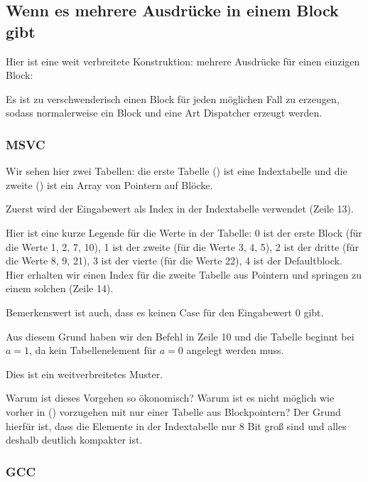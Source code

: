 \subsection{Wenn es mehrere  Ausdrücke in einem Block gibt}
Hier ist eine weit verbreitete Konstruktion: mehrere  Ausdrücke für einen einzigen Block:


Es ist zu verschwenderisch einen Block für jeden möglichen Fall zu erzeugen, sodass normalerweise ein Block und eine Art
Dispatcher erzeugt werden.

\subsubsection{MSVC}


Wir sehen hier zwei Tabellen: die erste Tabelle () ist eine Indextabelle und die zweite () ist
ein Array von Pointern auf Blöcke.

Zuerst wird der Eingabewert als Index in der Indextabelle verwendet (Zeile 13).

Hier ist eine kurze Legende für die Werte in der Tabelle:
0 ist der erste  Block (für die Werte 1, 2, 7, 10),
1 ist der zweite (für die Werte 3, 4, 5),
2 ist der dritte (für die Werte 8, 9, 21),
3 ist der vierte (für die Werte 22),
4 ist der Defaultblock.
Hier erhalten wir einen Index für die zweite Tabelle aus Pointern und springen zu einem solchen (Zeile 14).

Bemerkenswert ist auch, dass es keinen Case für den Eingabewert 0 gibt. 

Aus diesem Grund haben wir den \DEC Befehl in Zeile 10 und die Tabelle beginnt bei $a=1$, da kein Tabellenelement für
$a=0$ angelegt werden muss.

Dies ist ein weitverbreitetes Muster.

Warum ist dieses Vorgehen so ökonomisch?
Warum ist es nicht möglich wie vorher in () vorzugehen mit nur einer Tabelle aus Blockpointern?
Der Grund hierfür ist, dass die Elemente in der Indextabelle nur 8 Bit groß sind und alles deshalb deutlich kompakter
ist.

\subsubsection{GCC}

